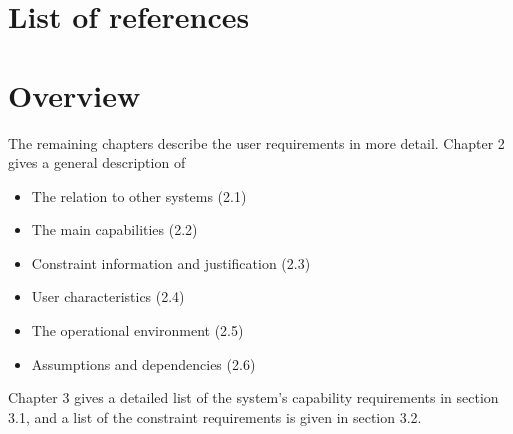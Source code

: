\section{List of references}





\section{Overview}

The remaining chapters describe the user requirements in more detail. Chapter 2 gives a general description of
\begin{itemize}
\item The relation to other systems (2.1)
\item The main capabilities (2.2)
\item Constraint information and justification (2.3)
\item User characteristics (2.4)
\item The operational environment (2.5)
\item Assumptions and dependencies (2.6)
\end{itemize}

Chapter 3 gives a detailed list of the system's capability requirements in section 3.1, and a list of the constraint requirements is given in section 3.2.


